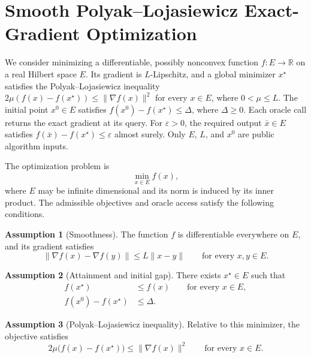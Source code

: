 \documentclass[10pt]{article}
\theoremstyle{definition}
\newtheorem{assumption}{Assumption}
\begin{document}
\section*{Smooth Polyak--Lojasiewicz Exact-Gradient Optimization}
We consider minimizing a differentiable, possibly nonconvex function $f:E\to\mathbb{R}$ on a real Hilbert space $E$. Its gradient is $L$-Lipschitz, and a global minimizer $x^\star$ satisfies the Polyak--Lojasiewicz inequality $2\mu(f(x)-f(x^\star))\leq\|\nabla f(x)\|^2$ for every $x\in E$, where $0<\mu\leq L$. The initial point $x^0\in E$ satisfies $f(x^0)-f(x^\star)\leq\Delta$, where $\Delta\geq0$. Each oracle call returns the exact gradient at its query. For $\varepsilon>0$, the required output $\bar{x}\in E$ satisfies $f(\bar{x})-f(x^\star)\leq\varepsilon$ almost surely. Only $E$, $L$, and $x^0$ are public algorithm inputs.

The optimization problem is
\begin{equation}
\label{eq:problem}
\min_{x\in E} f(x),
\end{equation}
where $E$ may be infinite dimensional and its norm is induced by its inner product. The admissible objectives and oracle access satisfy the following conditions.

\begin{assumption}[Smoothness]
The function $f$ is differentiable everywhere on $E$, and its gradient satisfies
\begin{equation}
\|\nabla f(x)-\nabla f(y)\|\leq L\|x-y\|
\qquad\text{for every }x,y\in E.
\end{equation}
\end{assumption}

\begin{assumption}[Attainment and initial gap]
There exists $x^\star\in E$ such that
\begin{align}
f(x^\star)&\leq f(x) \qquad\text{for every }x\in E,\\
f(x^0)-f(x^\star)&\leq\Delta.
\end{align}
\end{assumption}

\begin{assumption}[Polyak--Lojasiewicz inequality]
Relative to this minimizer, the objective satisfies
\begin{equation}
2\mu\bigl(f(x)-f(x^\star)\bigr)\leq\|\nabla f(x)\|^2
\qquad\text{for every }x\in E.
\end{equation}
\end{assumption}
\end{document}
